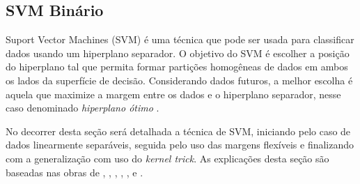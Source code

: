 \subsection{SVM Binário} \label{SEC_CONCEITOS_FUNDAMENTAIS_SVM_CLASSIFICACAO}
Suport Vector Machines (SVM) é uma técnica que pode ser usada para classificar dados usando um hiperplano separador. O objetivo do SVM é escolher a posição do hiperplano tal que permita formar partições homogêneas de dados em ambos os lados da superfície de decisão. Considerando dados futuros, a melhor escolha é aquela que maximize a margem entre os dados e o hiperplano separador, nesse caso denominado \emph{hiperplano ótimo} \cite{MachineLearningwithR2013}. 

No decorrer desta seção será detalhada a técnica de SVM, iniciando pelo caso de dados linearmente separáveis, seguida pelo uso das margens flexíveis e finalizando com a generalização com uso do \emph{kernel trick}. As explicações desta seção são baseadas nas obras de , , , , ,  e . 

